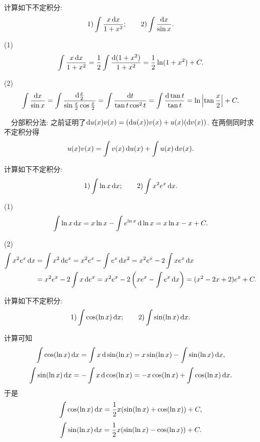 \begin{example}
	计算如下不定积分: $$1) \int \frac{x\mathop{}\!\mathrm{d} x}{1+x^2};\qquad 2) \int \frac{\mathop{}\!\mathrm{d} x}{\sin x}. $$
\end{example}
\begin{solution}
	(1) $$\int \frac{x\mathop{}\!\mathrm{d} x}{1+x^2} = \frac{1}{2} \int \frac{\mathop{}\!\mathrm{d} (1+x^2)}{1+x^2} = \frac{1}{2}\ln (1+x^2) +C.$$
	
	(2) $$\int \frac{\mathop{}\!\mathrm{d} x}{\sin x} = \int \frac{\mathop{}\!\mathrm{d} \frac{x}{2}}{\sin \frac{x}{2} \cos \frac{x}{2}} = \int \frac{\mathop{}\!\mathrm{d} t}{\tan t \cos ^2 t} = \int \frac{\mathop{}\!\mathrm{d} \tan t}{\tan t} = \ln \left| \tan \frac{x}{2} \right| + C.$$
\end{solution}

~~分部积分法: 之前证明了$\mathop{}\!\mathrm{d} u(x)v(x) = (\mathop{}\!\mathrm{d} u(x)) v(x) + u(x) (\mathop{}\!\mathrm{d} v(x))$. 在两侧同时求不定积分得$$u(x)v(x) = \int v(x) \mathop{}\!\mathrm{d} u(x) + \int u(x) \mathop{}\!\mathrm{d} v(x). $$

\begin{example}
	计算如下不定积分: $$1) \int \ln x \mathop{}\!\mathrm{d} x;\qquad 2) \int x^2e^x \mathop{}\!\mathrm{d} x. $$
\end{example}
\begin{solution}
	(1) $$\int \ln x \mathop{}\!\mathrm{d} x = x\ln x - \int e^{\ln x}\mathop{}\!\mathrm{d} \ln x = x\ln x - x + C.$$
	
	(2) \begin{align*}
		\int x^2e^x \mathop{}\!\mathrm{d} x &= \int x^2 \mathop{}\!\mathrm{d} e^x = x^2e^x - \int e^x \mathop{}\!\mathrm{d} x^2 = x^2e^x - 2\int xe^x \mathop{}\!\mathrm{d} x \\
		&= x^2e^x - 2\int x \mathop{}\!\mathrm{d} e^x = x^2e^x - 2\left( xe^x-\int e^x \mathop{}\!\mathrm{d} x \right) = (x^2-2x+2)e^x + C. 
	\end{align*}
\end{solution}

\begin{example}
	计算如下不定积分: $$1) \int \cos (\ln x) \mathop{}\!\mathrm{d} x;\qquad 2) \int \sin (\ln x) \mathop{}\!\mathrm{d} x.$$
\end{example}
\begin{solution}
	计算可知$$\int \cos (\ln x) \mathop{}\!\mathrm{d} x = \int x \mathop{}\!\mathrm{d} \sin (\ln x) = x\sin (\ln x) - \int \sin (\ln x) \mathop{}\!\mathrm{d} x,$$
	$$\int \sin (\ln x) \mathop{}\!\mathrm{d} x = -\int x \mathop{}\!\mathrm{d} \cos (\ln x) = -x\cos (\ln x) + \int \cos (\ln x) \mathop{}\!\mathrm{d} x.$$
	于是$$\int \cos (\ln x) \mathop{}\!\mathrm{d} x = \frac{1}{2}x(\sin (\ln x)+ \cos (\ln x)) +C,$$
	$$\int \sin (\ln x) \mathop{}\!\mathrm{d} x = \frac{1}{2}x(\sin (\ln x)- \cos (\ln x)) +C.$$
\end{solution}

